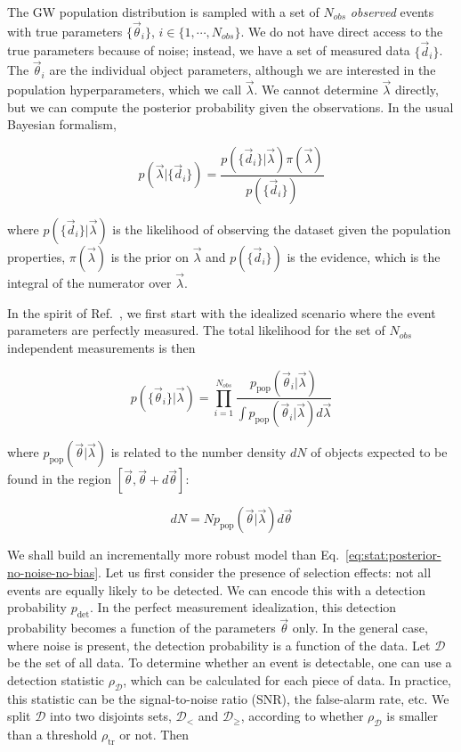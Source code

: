 \documentclass[%
preprint,
 amsmath,amssymb,
 aps,
]{revtex4-2}
\newcommand{\given}[2]{p( #1 | #2 )}
\newcommand{\ppop}[0]{p_{\text{pop}}}
\newcommand{\pdet}[0]{p_{\text{det}}}
\begin{document}
The GW population distribution is sampled with a set of $N_{obs}$ \textit{observed} events with
true parameters $\{ \vec{\theta}_i \}$, $i \in \{1, \cdots, N_{obs}\}$. We do not have direct
access to the true parameters because of noise; instead, we have a set of measured data $\{
	\vec{d}_i \}$. The $\vec{\theta}_i$ are the individual object parameters, although we are
interested in the population hyperparameters, which we call $\vec{\lambda}$. We cannot determine
$\vec{\lambda}$ directly, but we can compute the posterior probability given the observations. In
the usual Bayesian formalism,

\begin{equation}
	\given{\vec{\lambda}}{\{\vec{d}_i \}} =
	\frac{\given{\{\vec{d}_i \}}{\vec{\lambda}} \pi(\vec{\lambda})}{p(\{\vec{d}_i \})}
\end{equation}

where $\given{\{\vec{d}_i \}}{\vec{\lambda}}$ is the likelihood of observing the dataset given the
population properties, $\pi(\vec{\lambda})$ is the prior on $\vec{\lambda}$ and $p(\{\vec{d}_i \})$
is the evidence, which is the integral of the numerator over $\vec{\lambda}$.

In the spirit of Ref.~, we first start with the idealized scenario where
the event parameters are perfectly measured. The total likelihood for the set of $N_{obs}$
independent measurements is then

\begin{equation}
	\label{eq:stat:posterior-no-noise-no-bias}
	\given{\{ \vec{\theta}_i \}}{\vec{\lambda}} =
	\prod_{i=1}^{N_{obs}} \frac{\ppop(\vec{\theta}_i | \vec{\lambda})}{\int \ppop(\vec{\theta}_i | \vec{\lambda}) d\vec{\lambda}}
\end{equation}

where $\ppop(\vec{\theta} | \vec{\lambda})$ is related to the number density $dN$ of objects
expected to be found in the region $[\vec{\theta}, \vec{\theta} + d\vec{\theta}]$:

\begin{equation}
	dN = N \ppop(\vec{\theta} | \vec{\lambda}) d\vec{\theta}
\end{equation}

We shall build an incrementally more robust model than
Eq.~\eqref{eq:stat:posterior-no-noise-no-bias}. Let us first consider the presence of selection
effects: not all events are equally likely to be detected. We can encode this with a detection
probability $\pdet$. In the perfect measurement idealization, this detection probability becomes a
function of the parameters $\vec{\theta}$ only. In the general case, where noise is present, the
detection probability is a function of the data. Let $\mathcal{D}$ be the set of all data. To
determine whether an event is detectable, one can use a detection statistic $\rho_{\mathcal{D}}$,
which can be calculated for each piece of data. In practice, this statistic can be the
signal-to-noise ratio (SNR), the false-alarm rate, etc. We split $\mathcal{D}$ into two disjoints
sets, $\mathcal{D}_<$ and $\mathcal{D}_\geq$, according to whether $\rho_\mathcal{D}$ is smaller
than a threshold $\rho_{\text{tr}}$ or not. Then
\end{document}
